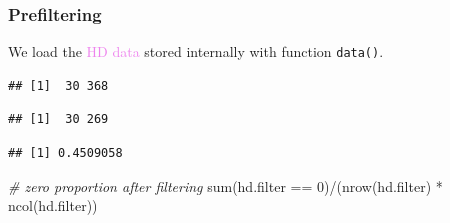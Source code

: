 \documentclass[
]{book}
\newenvironment{Shaded}{\begin{snugshade}}{\end{snugshade}}
\newcommand{\AttributeTok}[1]{\textcolor[rgb]{0.77,0.63,0.00}{#1}}
\newcommand{\CommentTok}[1]{\textcolor[rgb]{0.56,0.35,0.01}{\textit{#1}}}
\newcommand{\DecValTok}[1]{\textcolor[rgb]{0.00,0.00,0.81}{#1}}
\newcommand{\FunctionTok}[1]{\textcolor[rgb]{0.00,0.00,0.00}{#1}}
\newcommand{\NormalTok}[1]{#1}
\newcommand{\OtherTok}[1]{\textcolor[rgb]{0.56,0.35,0.01}{#1}}
\newcommand{\SpecialCharTok}[1]{\textcolor[rgb]{0.00,0.00,0.00}{#1}}
\newcommand{\StringTok}[1]{\textcolor[rgb]{0.31,0.60,0.02}{#1}}
\begin{document}
\hypertarget{prefiltering-1}{%
\subsubsection{Prefiltering}\label{prefiltering-1}}

We load the \textcolor{violet}{HD data} stored internally with function \texttt{data()}.

\begin{Shaded}
\end{Shaded}

\begin{verbatim}
## [1]  30 368
\end{verbatim}

\begin{Shaded}
\end{Shaded}

\begin{verbatim}
## [1]  30 269
\end{verbatim}

\begin{Shaded}
\end{Shaded}

\begin{verbatim}
## [1] 0.4509058
\end{verbatim}

\begin{Shaded}
\begin{Highlighting}[]
\CommentTok{\# zero proportion after filtering}
\FunctionTok{sum}\NormalTok{(hd.filter }\SpecialCharTok{==} \DecValTok{0}\NormalTok{)}\SpecialCharTok{/}\NormalTok{(}\FunctionTok{nrow}\NormalTok{(hd.filter) }\SpecialCharTok{*} \FunctionTok{ncol}\NormalTok{(hd.filter))}
\end{Highlighting}
\end{Shaded}
\end{document}
